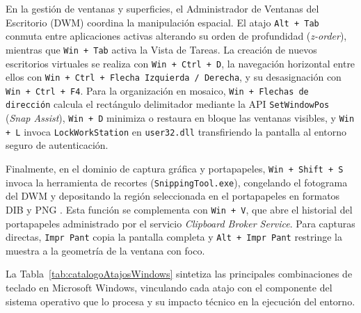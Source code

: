 \documentclass[12pt]{article}
\begin{document}
En la gestión de ventanas y superficies, el Administrador de Ventanas del Escritorio (DWM) coordina la manipulación espacial. El atajo \texttt{Alt + Tab} conmuta entre aplicaciones activas alterando su orden de profundidad (\textit{z-order}), mientras que \texttt{Win + Tab} activa la Vista de Tareas. La creación de nuevos escritorios virtuales se realiza con \texttt{Win + Ctrl + D}, la navegación horizontal entre ellos con \texttt{Win + Ctrl + Flecha Izquierda / Derecha}, y su desasignación con \texttt{Win + Ctrl + F4}. Para la organización en mosaico, \texttt{Win + Flechas de dirección} calcula el rectángulo delimitador mediante la API \texttt{SetWindowPos} (\textit{Snap Assist}), \texttt{Win + D} minimiza o restaura en bloque las ventanas visibles, y \texttt{Win + L} invoca \texttt{LockWorkStation} en \texttt{user32.dll} transfiriendo la pantalla al entorno seguro de autenticación.

Finalmente, en el dominio de captura gráfica y portapapeles, \texttt{Win + Shift + S} invoca la herramienta de recortes (\texttt{SnippingTool.exe}), congelando el fotograma del DWM y depositando la región seleccionada en el portapapeles en formatos DIB y PNG \parencite{microsoftShortcutsWindows}. Esta función se complementa con \texttt{Win + V}, que abre el historial del portapapeles administrado por el servicio \textit{Clipboard Broker Service}. Para capturas directas, \texttt{Impr Pant} copia la pantalla completa y \texttt{Alt + Impr Pant} restringe la muestra a la geometría de la ventana con foco.

La Tabla~\ref{tab:catalogoAtajosWindows} sintetiza las principales combinaciones de teclado en Microsoft Windows, vinculando cada atajo con el componente del sistema operativo que lo procesa y su impacto técnico en la ejecución del entorno.
\end{document}
